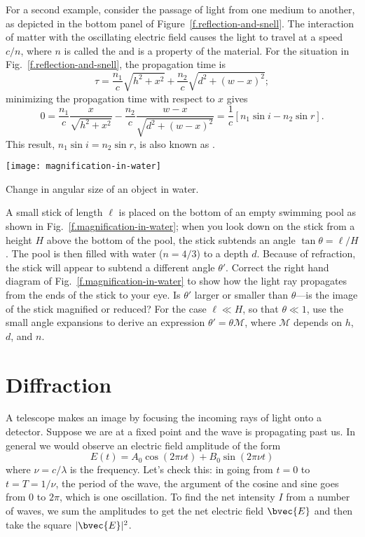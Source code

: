 For a second example, consider the passage of light from one medium to another, as depicted in the bottom panel of Figure~\ref{f.reflection-and-snell}.  The interaction of matter with the oscillating electric field causes the light to travel at a speed $c/n$, where $n$ is called the  and is a property of the material. For the situation in Fig.~\ref{f.reflection-and-snell}, the propagation time is
\[
	\tau = \frac{n_{1}}{c}\sqrt{h^{2}+x^{2}} + \frac{n_{2}}{c}\sqrt{d^{2} + (w-x)^{2}};
\]
minimizing the propagation time with respect to $x$ gives
\[
	0 = \frac{n_{1}}{c}\frac{x}{\sqrt{h^{2}+x^{2}}} - \frac{n_{2}}{c} \frac{w-x}{\sqrt{d^{2} + (w-x)^{2}}} = \frac{1}{c}\left[ n_{1}\sin i - n_{2} \sin r \right].
\]
This result, $n_{1}\sin i = n_{2}\sin r$, is also known as .

\begin{marginfigure}[5em]
\texttt{[image: magnification-in-water]}
\caption{Change in angular size of an object in water.
\label{f.magnification-in-water}}
\end{marginfigure}
\begin{exercisebox}
A small stick of length $\ell$ is placed on the bottom of an empty swimming pool as shown in Fig.~\ref{f.magnification-in-water}; when you look down on the stick from a height $H$ above the bottom of the pool, the stick subtends an angle $\tan\theta = \ell/H$.  The pool is then filled with water ($n=4/3$) to a depth $d$.  Because of refraction, the stick will appear to subtend a different angle $\theta'$.  Correct the right hand diagram of Fig.~\ref{f.magnification-in-water} to show how the light ray propagates from the ends of the stick to your eye.  Is $\theta'$ larger or smaller than $\theta$---is the image of the stick magnified or reduced?  For the case $\ell \ll H$, so that $\theta \ll 1$, use the small angle expansions to derive an expression $\theta' = 
\theta \mathcal{M}$, where $\mathcal{M}$ depends on $h$, $d$, and $n$.
\end{exercisebox}

\section{Diffraction}

A telescope makes an image by focusing the incoming rays of light onto a detector.
Suppose we are at a fixed point and the wave is propagating past us.  In general we would observe an electric field amplitude of the form 
\[ E(t) = A_{0}\cos\left(2\pi \nu t \right)  + B_{0}\sin\left(2\pi \nu t \right) \]
where $\nu = c/\lambda$ is the frequency.  Let's check this: in going from $t=0$ to $t=T=1/\nu$, the period of the wave, the argument of the cosine and sine goes from $0$ to $2\pi$, which is one oscillation.  To find the net intensity $I$ from a number of waves, we sum the amplitudes to get the net electric field $\bvec{E}$ and then take the square $|\bvec{E}|^{2}$.


